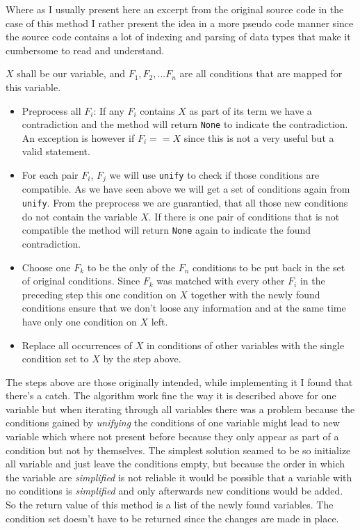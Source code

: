Where as I usually present here an excerpt from the original source code in the case of this method I rather present the idea in a more pseudo code manner since the source code contains a lot of indexing and parsing of data types that make it cumbersome to read and understand.

$X$ shall be our variable, and $F_1, F_2, ... F_n$ are all conditions that are mapped for this variable.

\begin{itemize}
	\item Preprocess all $F_i$: If any $F_i$ contains $X$ as part of its term we have a contradiction and the method will return \texttt{None} to indicate the contradiction. An exception is however if $F_i == X$ since this is not a very useful but a valid statement.
	\item For each pair $F_i$, $F_j$ we will use \texttt{unify} to check if those conditions are compatible. As we have seen above we will get a set of conditions again from \texttt{unify}. From the preprocess we are guarantied, that all those new conditions do not contain the variable $X$. If there is one pair of conditions that is not compatible the method will return \texttt{None} again to indicate the found contradiction.
	\item Choose one $F_k$ to be the only of the $F_n$ conditions to be put back in the set of original conditions. Since $F_k$ was matched with every other $F_i$ in the preceding step this one condition on $X$ together with the newly found conditions ensure that we don't loose any information and at the same time have only one condition on $X$ left.
	\item Replace all occurrences of $X$ in conditions of other variables with the single condition set to $X$ by the step above.
\end{itemize}

The steps above are those originally intended, while implementing it I found that there's a catch. The algorithm work fine the way it is described above for one variable but when iterating through all variables there was a problem because the conditions gained by \emph{unifying} the conditions of one variable might lead to new variable which where not present before because they only appear as part of a condition but not by themselves. The simplest solution seamed to be so initialize all variable and just leave the conditions empty, but because the order in which the variable are \emph{simplified} is not reliable it would be possible that a variable with no conditions is \emph{simplified} and only afterwards new conditions would be added. So the return value of this method is a list of the newly found variables. The condition set doesn't have to be returned since the changes are made in place.


